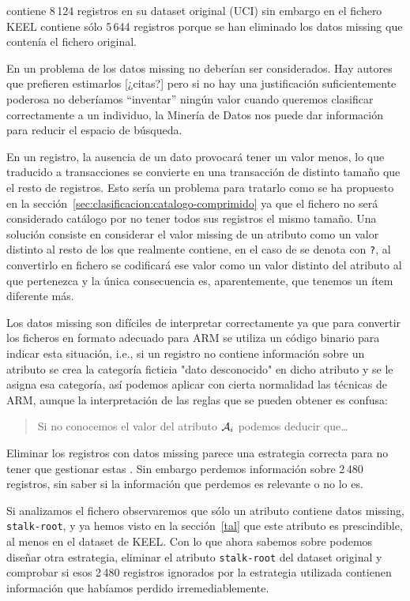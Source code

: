 \ABIERTO
\mushroom contiene 8\,124 registros en su dataset original (UCI) sin embargo en el fichero KEEL contiene sólo 5\,644 registros porque se han eliminado los datos missing que contenía el fichero original.

En un problema de \clasificacion los datos missing no deberían ser considerados. Hay autores que prefieren estimarlos [¿citas?] pero si no hay una justificación suficientemente poderosa no deberíamos ``inventar'' ningún valor cuando queremos clasificar correctamente a un individuo, la Minería de Datos nos puede dar información para reducir el espacio de búsqueda.

En un registro, la ausencia de un dato provocará tener un valor menos, lo que traducido a transacciones se convierte en una transacción de distinto tamaño que el resto de registros. Esto sería un problema para tratarlo como se ha propuesto en la sección~\ref{sec:clasificacion:catalogo-comprimido} ya que el fichero \D no será considerado catálogo por no tener todos sus registros el mismo tamaño. Una solución consiste en considerar el valor missing de un atributo como un valor distinto al resto de los que realmente contiene, en el caso de \mushroom se denota con \texttt{?}, al convertirlo en fichero \D se codificará ese valor como un valor distinto del atributo al que pertenezca y la única consecuencia es, aparentemente, que tenemos un ítem diferente más.

Los datos missing son difíciles de interpretar correctamente ya que para convertir los ficheros en formato adecuado para ARM se utiliza un código binario para indicar esta situación, i.e., si un registro no contiene información sobre un atributo se crea la categoría ficticia "dato desconocido" en dicho atributo y se le asigna esa categoría, así podemos aplicar con cierta normalidad las técnicas de ARM, aunque la interpretación de las reglas que se pueden obtener es confusa:

\begin{quote}
Si no conocemos el valor del atributo $\A_i$ podemos deducir que\ldots
\end{quote}

Eliminar los registros con datos missing parece una estrategia correcta para no tener que gestionar estas \ars. Sin embargo perdemos información sobre 2\,480 registros, sin saber si la información que perdemos es relevante o no lo es.

Si analizamos el fichero observaremos que sólo un atributo contiene datos missing, \texttt{stalk-root}, y ya hemos visto en la sección~\ref{tal} que este atributo es prescindible, al menos en el dataset de KEEL. Con lo que ahora sabemos sobre \catalogos podemos diseñar otra estrategia, eliminar el atributo \texttt{stalk-root} del dataset original y comprobar si esos 2\,480 registros ignorados por la estrategia utilizada contienen información que habíamos perdido irremediablemente.

